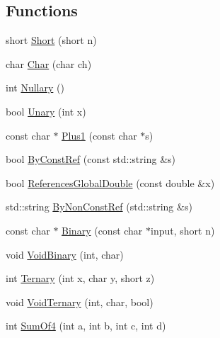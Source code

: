 \subsection*{Functions}
\begin{DoxyCompactItemize}
\item 
short \mbox{\hyperlink{namespacetesting_1_1gmock__generated__actions__test_a7c442b3594b6717b8d499781a82170b2}{Short}} (short n)
\item 
char \mbox{\hyperlink{namespacetesting_1_1gmock__generated__actions__test_aa07e216a4c9d492fb7e7c8fde949bc8f}{Char}} (char ch)
\item 
int \mbox{\hyperlink{namespacetesting_1_1gmock__generated__actions__test_acb3d926ebbe88529c38d95f5e61573ef}{Nullary}} ()
\item 
bool \mbox{\hyperlink{namespacetesting_1_1gmock__generated__actions__test_a61f0e6c3f2c07079299f1d6e1667ab92}{Unary}} (int x)
\item 
const char $\ast$ \mbox{\hyperlink{namespacetesting_1_1gmock__generated__actions__test_a75e901c6d28c591c53a54320a294da55}{Plus1}} (const char $\ast$s)
\item 
bool \mbox{\hyperlink{namespacetesting_1_1gmock__generated__actions__test_aecf48d9fccd335e231a51013e61b8129}{By\+Const\+Ref}} (const std\+::string \&s)
\item 
bool \mbox{\hyperlink{namespacetesting_1_1gmock__generated__actions__test_a3e552b41de08f0516f4b0e32fed68a61}{References\+Global\+Double}} (const double \&x)
\item 
std\+::string \mbox{\hyperlink{namespacetesting_1_1gmock__generated__actions__test_afe690aca473d063bec7f07e48e0e418c}{By\+Non\+Const\+Ref}} (std\+::string \&s)
\item 
const char $\ast$ \mbox{\hyperlink{namespacetesting_1_1gmock__generated__actions__test_a3ec2020ddbfa6f2e993e0f88be1e691f}{Binary}} (const char $\ast$input, short n)
\item 
void \mbox{\hyperlink{namespacetesting_1_1gmock__generated__actions__test_af957302d6c2b4dacd31385f2a34b529f}{Void\+Binary}} (int, char)
\item 
int \mbox{\hyperlink{namespacetesting_1_1gmock__generated__actions__test_a1b234626e33284c4159ea666d240d5ed}{Ternary}} (int x, char y, short z)
\item 
void \mbox{\hyperlink{namespacetesting_1_1gmock__generated__actions__test_a7b1b519421c70b90ea3c818d4cf565ac}{Void\+Ternary}} (int, char, bool)
\item 
int \mbox{\hyperlink{namespacetesting_1_1gmock__generated__actions__test_a2a5879c060adacf27c3528260172a7be}{Sum\+Of4}} (int a, int b, int c, int d)

\end{DoxyCompactItemize}
